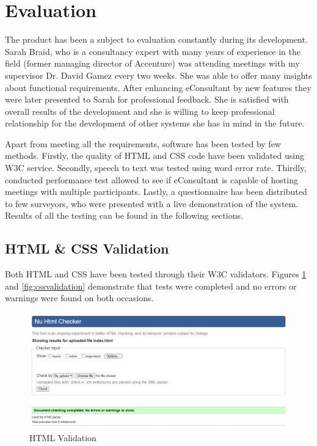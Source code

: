 \documentclass{article}
\begin{document}
\newpage
\section{Evaluation}
{\large 
The product has been a subject to evaluation constantly during its development. Sarah Braid, who is a consultancy expert with many years of experience in the field (former managing director of Accenture) was attending meetings with my supervisor Dr. David Gamez every two weeks. She was able to offer many insights about functional requirements. After enhancing eConsultant by new features they were later presented to Sarah for professional feedback. She is satisfied with overall results of the development and she is willing to keep professional relationship for the development of other systems she has in mind in the future.\par

Apart from meeting all the requirements, software has been tested by few methods. Firstly, the quality of HTML and CSS code have been validated using W3C service. Secondly, speech to text was tested using word error rate. Thirdly, conducted performance test allowed to see if eConsultant is capable of hosting meetings with multiple participants. Lastly, a questionnaire has been distributed to few surveyors, who were presented with a live demonstration of the system. Results of all the testing can be found in the following sections.\par
}

\subsection{HTML \& CSS Validation}
{\large 
Both HTML and CSS have been tested through their W3C validators. Figures \ref{fig:htmlvalidation} and \ref{fig:cssvalidation} demonstrate that tests were completed and no errors or warnings were found on both occasions.\par
}

\begin{figure}[H]
  \centering
  \includegraphics[scale=0.51]{implementation/html.png}
  \caption{HTML Validation}
  \label{fig:htmlvalidation}
\end{figure}
\end{document}
